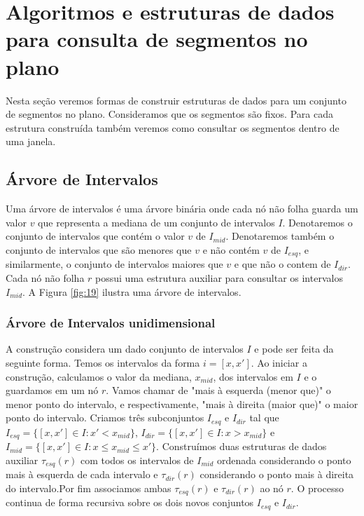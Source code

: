 \chapter{Algoritmos e estruturas de dados para consulta de segmentos no plano}
Nesta seção veremos formas de construir estruturas de dados para um conjunto de segmentos no plano. Consideramos que os segmentos são fixos. Para cada estrutura construída também veremos como consultar os segmentos dentro de uma janela.

\section{Árvore de Intervalos}
Uma árvore de intervalos é uma árvore binária onde cada nó não folha guarda um valor $v$ que representa a mediana de um conjunto de intervalos $I$. Denotaremos o conjunto de intervalos que contém o valor $v$ de $I_{mid}$. Denotaremos também o conjunto de intervalos que são menores que $v$ e não contém $v$ de $I_{esq}$, e similarmente, o conjunto de intervalos maiores que $v$ e que não o contem de $I_{dir}$. Cada nó não folha $r$ possui uma estrutura auxiliar para consultar os intervalos $I_{mid}$. A Figura \ref{fig:19} ilustra uma árvore de intervalos.
 
\subsection{Árvore de Intervalos unidimensional}
A construção considera um dado conjunto de intervalos $I$ e pode ser feita da seguinte forma. Temos os intervalos da forma $i = [x,x']$. Ao iniciar a construção, calculamos o valor da mediana, $x_{mid}$, dos intervalos em $I$ e o guardamos em um nó $r$. Vamos chamar de "mais à esquerda (menor que)" o menor ponto do intervalo, e respectivamente, "mais à direita (maior que)" o maior ponto do intervalo. Criamos três subconjuntos $I_{esq}$ e $I_{dir}$ tal que $I_{esq} = \{[x, x'] \in I : x' < x_{mid} \}$, $I_{dir} = \{[x, x'] \in I : x > x_{mid} \}$ e $I_{mid} = \{[x, x'] \in I : x \leq x_{mid} \leq x' \}$. Construímos duas estruturas de dados auxiliar $\tau_{esq}(r)$ com todos os intervalos de $I_{mid}$ ordenada considerando o ponto mais à esquerda de cada intervalo e $\tau_{dir}(r)$ considerando o ponto mais à direita do intervalo.Por fim associamos ambas  $\tau_{esq}(r)$  e  $\tau_{dir}(r)$ ao nó $r$. O processo continua de forma recursiva sobre os dois novos conjuntos $I_{esq}$ e $I_{dir}$. 

